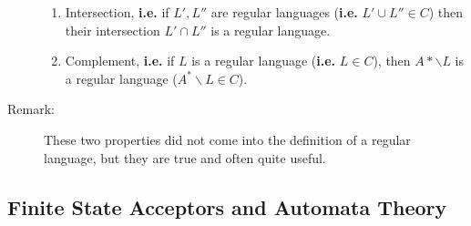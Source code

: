 \documentclass[10pt]{article}
\begin{document}
\begin{description}
		\begin{enumerate}
			\item Intersection, \textbf{i.e.} if $L', L''$ are regular languages (\textbf{i.e.} $L' \cup L'' \in C$) then their intersection $L' \cap L''$ is a regular language.
			\item Complement, \textbf{i.e.} if $L$ is a regular language (\textbf{i.e.} $L \in C$), then $A* \backslash L$ is a regular language ($A^* \backslash L \in C$).
		\end{enumerate}
		\item[Remark:] These two properties did not come into the definition of a regular language, but they are true and often quite useful.
	\end{description}
	
	\subsection{Finite State Acceptors and Automata Theory}
\end{document}
